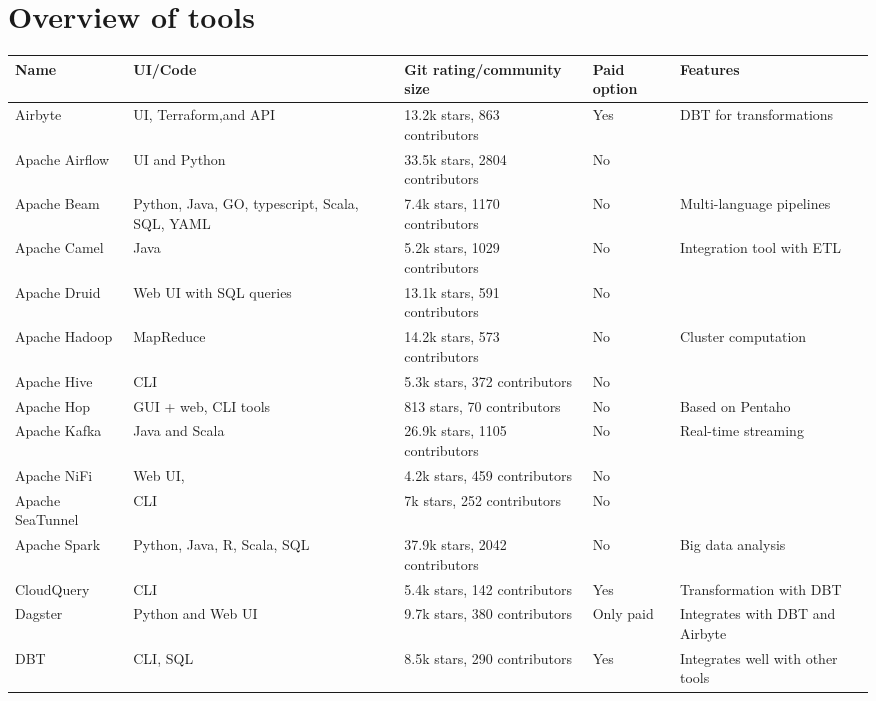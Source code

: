 \documentclass[11pt]{article}
\begin{document}
\section{Overview of tools}
\label{appendix:tools}
\begin{table}[H]
\centering
    \begin{tabular}[c]{|p{2cm}|p{4cm}|p{4cm}|p{1.5cm}|p{4cm}|}
    \hline
    \textbf{Name} & \textbf{UI/Code} & \textbf{Git rating/community size} & \textbf{Paid option} & \textbf{Features} \\ \hline
    Airbyte & UI, Terraform,and API & 13.2k stars, 863 contributors & Yes & DBT for transformations \\ \hline
    Apache Airflow & UI and Python & 33.5k stars, 2804 contributors & No &  \\ \hline
    Apache Beam & Python, Java, GO, typescript, Scala, SQL, YAML & 7.4k stars, 1170 contributors & No & Multi-language pipelines \\ \hline
    Apache Camel & Java & 5.2k stars, 1029 contributors & No & Integration tool with ETL \\ \hline
    Apache Druid & Web UI with SQL queries & 13.1k stars, 591 contributors & No &  \\ \hline
    Apache Hadoop & MapReduce & 14.2k stars, 573 contributors & No & Cluster computation \\ \hline
    Apache Hive & CLI & 5.3k stars, 372 contributors & No &  \\ \hline
    Apache Hop & GUI + web, CLI tools & 813 stars, 70 contributors & No & Based on Pentaho \\ \hline
    Apache Kafka & Java and Scala & 26.9k stars, 1105 contributors & No & Real-time streaming \\ \hline
    Apache NiFi & Web UI, & 4.2k stars, 459 contributors & No &  \\ \hline
    Apache SeaTunnel & CLI & 7k stars, 252 contributors & No &  \\ \hline
    Apache Spark & Python, Java, R, Scala, SQL & 37.9k stars, 2042 contributors & No & Big data analysis \\ \hline
    CloudQuery & CLI & 5.4k stars, 142 contributors & Yes & Transformation with DBT \\ \hline
    Dagster & Python and Web UI & 9.7k stars, 380 contributors & Only paid & Integrates with DBT and Airbyte \\ \hline
    DBT & CLI, SQL & 8.5k stars, 290 contributors & Yes & Integrates well with other tools \\ \hline

\end{tabular}
\end{table}
\end{document}
